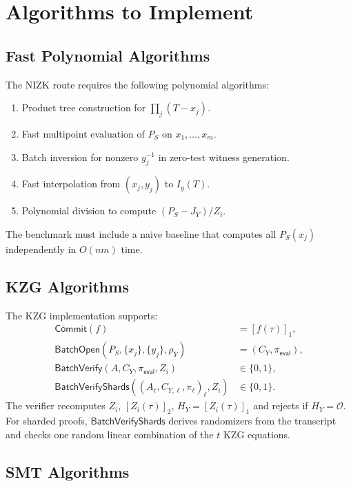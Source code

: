 \documentclass[UTF8,a4paper,11pt]{ctexart}
\begin{document}
\section{Algorithms to Implement}

\subsection{Fast Polynomial Algorithms}

The NIZK route requires the following polynomial algorithms:
\begin{enumerate}[leftmargin=2em]
  \item Product tree construction for $\prod_j(T-x_j)$.
  \item Fast multipoint evaluation of $P_S$ on $x_1,\ldots,x_m$.
  \item Batch inversion for nonzero $y_j^{-1}$ in zero-test witness generation.
  \item Fast interpolation from $(x_j,y_j)$ to $I_y(T)$.
  \item Polynomial division to compute $(P_S-J_Y)/Z_i$.
\end{enumerate}

The benchmark must include a naive baseline that computes all $P_S(x_j)$ independently in $O(nm)$ time.

\subsection{KZG Algorithms}

The KZG implementation supports:
\begin{align*}
  \mathsf{Commit}(f)&=[f(\tau)]_1,\\
  \mathsf{BatchOpen}(P_S,\{x_j\},\{y_j\},\rho_Y)&=(C_Y,\pi_{\mathsf{eval}}),\\
  \mathsf{BatchVerify}(A,C_Y,\pi_{\mathsf{eval}},Z_i)&\in\{0,1\},\\
  \mathsf{BatchVerifyShards}((A_\ell,C_{Y,\ell},\pi_\ell)_\ell,Z_i)&\in\{0,1\}.
\end{align*}
The verifier recomputes $Z_i$, $[Z_i(\tau)]_2$, $H_Y=[Z_i(\tau)]_1$ and rejects if $H_Y=\mathcal O$.
For sharded proofs, $\mathsf{BatchVerifyShards}$ derives randomizers from the transcript and checks one random linear combination of the $t$ KZG equations.

\subsection{SMT Algorithms}
\end{document}
